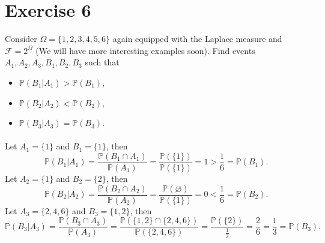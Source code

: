 \documentclass[12pt]{article}
\newenvironment{problem}
    {\begin{lrbox}{\mybox}\begin{minipage}{\textwidth-10pt}}
    {\end{minipage}\end{lrbox}\framebox[6.5in]{\usebox{\mybox}}}
\let\emptyset\varnothing
\newcommand{\FF}{\mathcal{F}}
\renewcommand{\P}{\mathbb{P}}
\begin{document}
\section*{Exercise 6}
\begin{problem}
    Consider $\Omega = \{1,2,3,4,5,6\}$ again equipped with the Laplace measure and $\FF = 2^\Omega$ (We will have more interesting examples soon). Find events $A_1, A_2, A_3, B_1, B_2, B_3$ such that
    \begin{itemize}
        \item $\P(B_1|A_1) > \P(B_1)$,
        \item $\P(B_2|A_2) < \P(B_2)$,
        \item $\P(B_3|A_3) = \P(B_3)$.
    \end{itemize}
\end{problem}
\paragraph{}

Let $A_1=\{1\}$ and $B_1=\{1\}$, then
\[\P(B_1 | A_1) = \frac{\P(B_1\cap A_1)}{\P(A_1)} = \frac{\P(\{1\})}{\P(\{1\})} = 1 > \frac16 = \P(B_1).\]
Let $A_2=\{1\}$ and $B_2=\{2\}$, then
\[\P(B_2 | A_2) = \frac{\P(B_2\cap A_2)}{\P(A_2)} = \frac{\P(\emptyset)}{\P(\{1\})} = 0 < \frac16 = \P(B_2).\]
Let $A_3=\{2,4,6\}$ and $B_3=\{1,2\}$, then
\[\P(B_3 | A_3) = \frac{\P(B_3\cap A_3)}{\P(A_3)} = \frac{\P(\{1,2\}\cap\{2,4,6\})}{\P(\{2,4,6\})} = \frac{\P(\{2\})}{\frac12} = \frac26 = \frac13 = \P(B_3).\]
\end{document}

